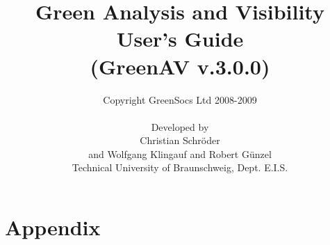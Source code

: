 \documentclass[a4paper,12pt,oneside]{gsbook}
\author{Copyright GreenSocs Ltd 2008-2009\\ \\Developed by\\Christian Schr\"oder\\ and Wolfgang Klingauf and Robert G\"unzel\\Technical University of Braunschweig, Dept. E.I.S.}
\title{Green Analysis and Visibility User's Guide\\(GreenAV v.3.0.0)}
\begin{document}
\maketitle

\tableofcontents

\listoffigures





\appendix

	\chapter{Appendix}

	
\end{document}
